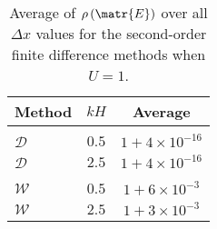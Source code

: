 \begin{table}
	\centering
	\begin{tabular}{l  c  c}
		\hline
		Method & $kH$& Average\\
		\hline && \\
		$\mathcal{D}$ & $0.5$ & $1+ 4\times 10^{-16}$  \\
		$\mathcal{D}$ & $2.5$ & $1+ 4\times 10^{-16}$  \\
		\hline \\
		$\mathcal{W}$ & $0.5$ & $1+ 6\times 10^{-3}$  \\
		$\mathcal{W}$ & $2.5$ & $1+ 3\times 10^{-3}$   \\
		\hline
	\end{tabular}
	\caption{Average of $\rho\left(\matr{E}\right)$ over all $\Delta x$ values for the second-order finite difference methods when $U=1$.}
	\label{tab:Averageofspectralradiusu=1}
\end{table}